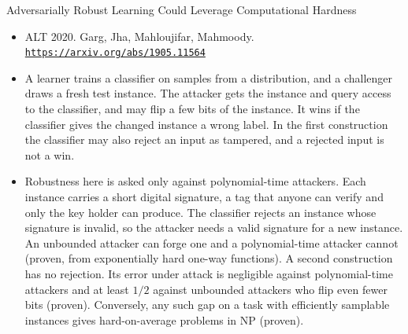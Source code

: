 \documentclass[aspectratio=169,10pt]{beamer}
\newcommand{\venue}[3]{\item #1. #2.\\ \href{#3}{\nolinkurl{#3}}}
\begin{document}
\begin{frame}{Adversarially Robust Learning Could Leverage Computational Hardness}
  \begin{itemize}
    \venue{ALT 2020}{Garg, Jha, Mahloujifar, Mahmoody}{https://arxiv.org/abs/1905.11564}
    \item A learner trains a classifier on samples from a distribution, and a challenger draws a fresh test instance. The attacker gets the instance and query access to the classifier, and may flip a few bits of the instance. It wins if the classifier gives the changed instance a wrong label. In the first construction the classifier may also reject an input as tampered, and a rejected input is not a win.
    \item Robustness here is asked only against polynomial-time attackers. Each instance carries a short digital signature, a tag that anyone can verify and only the key holder can produce. The classifier rejects an instance whose signature is invalid, so the attacker needs a valid signature for a new instance. An unbounded attacker can forge one and a polynomial-time attacker cannot (proven, from exponentially hard one-way functions). A second construction has no rejection. Its error under attack is negligible against polynomial-time attackers and at least $1/2$ against unbounded attackers who flip even fewer bits (proven). Conversely, any such gap on a task with efficiently samplable instances gives hard-on-average problems in NP (proven).
  \end{itemize}
\end{frame}
\end{document}

